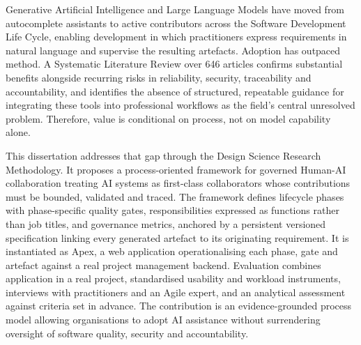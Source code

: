 \acresetall
\noindent Generative Artificial Intelligence and Large Language Models have moved from autocomplete assistants to active contributors across the Software Development Life Cycle, enabling development in which practitioners express requirements in natural language and supervise the resulting artefacts. Adoption has outpaced method. A Systematic Literature Review over 646 articles confirms substantial benefits alongside recurring risks in reliability, security, traceability and accountability, and identifies the absence of structured, repeatable guidance for integrating these tools into professional workflows as the field's central unresolved problem. Therefore, value is conditional on process, not on model capability alone.

This dissertation addresses that gap through the Design Science Research Methodology. It proposes a process-oriented framework for governed Human-AI collaboration treating AI systems as first-class collaborators whose contributions must be bounded, validated and traced. The framework defines lifecycle phases with phase-specific quality gates, responsibilities expressed as functions rather than job titles, and governance metrics, anchored by a persistent versioned specification linking every generated artefact to its originating requirement. It is instantiated as Apex, a web application operationalising each phase, gate and artefact against a real project management backend. Evaluation combines application in a real project, standardised usability and workload instruments, interviews with practitioners and an Agile expert, and an analytical assessment against criteria set in advance. The contribution is an evidence-grounded process model allowing organisations to adopt AI assistance without surrendering oversight of software quality, security and accountability.
